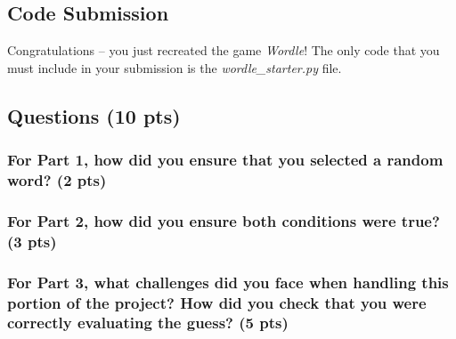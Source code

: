 \documentclass{article}
\begin{document}
\subsection{Code Submission}
Congratulations -- you just recreated the game \emph{Wordle}! The only code that you must include in your submission is the \emph{wordle\_starter.py} file.

\newpage
\subsection{Questions (10 pts)}
\subsubsection{For Part 1, how did you ensure that you selected a random word? (2 pts)}
\vspace{2in}

\subsubsection{For Part 2, how did you ensure both conditions were true? (3 pts)}
\vspace{2in}

\subsubsection{For Part 3, what challenges did you face when handling this portion of the project? How did you check that you were correctly evaluating the guess? (5 pts)}
\vspace{2in}
\end{document}
